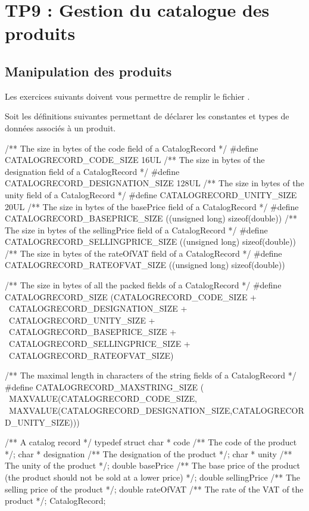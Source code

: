 \chapter{TP9 : Gestion du catalogue des produits}

\section{Manipulation des produits}

Les exercices suivants doivent vous permettre de remplir le fichier .

Soit les définitions suivantes permettant de déclarer les constantes et types de données associés à un produit.
\begin{csource}
/** The size in bytes of the code field of a CatalogRecord */
#define CATALOGRECORD_CODE_SIZE 16UL
/** The size in bytes of the designation field of a CatalogRecord */
#define CATALOGRECORD_DESIGNATION_SIZE 128UL
/** The size in bytes of the unity field of a CatalogRecord */
#define CATALOGRECORD_UNITY_SIZE 20UL
/** The size in bytes of the basePrice field of a CatalogRecord */
#define CATALOGRECORD_BASEPRICE_SIZE ((unsigned long) sizeof(double))
/** The size in bytes of the sellingPrice field of a CatalogRecord */
#define CATALOGRECORD_SELLINGPRICE_SIZE ((unsigned long) sizeof(double))
/** The size in bytes of the rateOfVAT field of a CatalogRecord */
#define CATALOGRECORD_RATEOFVAT_SIZE ((unsigned long) sizeof(double))

/** The size in bytes of all the packed fields of a CatalogRecord */
#define CATALOGRECORD_SIZE (CATALOGRECORD_CODE_SIZE + \
                            CATALOGRECORD_DESIGNATION_SIZE + \
                            CATALOGRECORD_UNITY_SIZE + \
                            CATALOGRECORD_BASEPRICE_SIZE + \
                            CATALOGRECORD_SELLINGPRICE_SIZE + \
                            CATALOGRECORD_RATEOFVAT_SIZE)

/** The maximal length in characters of the string fields of a CatalogRecord */
#define CATALOGRECORD_MAXSTRING_SIZE ( \
			MAXVALUE(CATALOGRECORD_CODE_SIZE, \
			MAXVALUE(CATALOGRECORD_DESIGNATION_SIZE,CATALOGRECORD_UNITY_SIZE)))

/** A catalog record
 */
typedef struct {
    char * code /** The code of the product */;
    char * designation /** The designation of the product */;
    char * unity /** The unity of the product */;
    double basePrice /** The base price of the product (the product should not be sold at a lower price) */;
    double sellingPrice /** The selling price of the product */;
    double rateOfVAT /** The rate of the VAT of the product */;
} CatalogRecord;

\end{csource}

